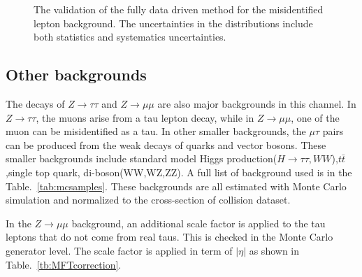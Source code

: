 \begin{figure}[htbp] 
     \centering
     \caption[Validation plots of fully data driven method]{The validation of the fully data driven method for the misidentified lepton background. The uncertainties in the distributions include both statistics and systematics uncertainties.}
     \label{fig:fakebackgroundValidation}
\end{figure}


\subsection{Other backgrounds}
The decays of $Z \to \tau\tau$ and $Z \to \mu\mu$ are also major backgrounds in this channel. In $Z \to \tau\tau$, the muons arise from a tau lepton decay, while in $Z \to \mu\mu$, one of the muon can be misidentified as a tau. In other smaller backgrounds, the $\mu\tau$ pairs can be produced from the weak decays of quarks and vector bosons. These smaller backgrounds include standard model Higgs production($H \to \tau\tau, WW$),$t\bar{t}$ ,single top quark, di-boson(WW,WZ,ZZ). A full list of background used is in the Table.~\ref{tab:mcsamples}.  These backgrounds are all estimated with Monte Carlo simulation and normalized to the cross-section of collision dataset.

In the $Z \to \mu\mu$  background, an additional scale factor is applied to the tau leptons that do not come from real taus. This is checked in the Monte Carlo generator level. The scale factor is applied in term of $|\eta|$ as shown in Table.~\ref{tb:MFTcorrection}.

